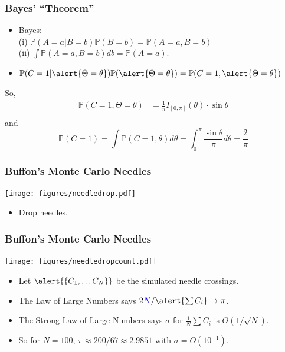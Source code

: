 \documentclass[]{beamer}
\newcommand{\PP}{\ensuremath{\mathbb P}}
\newcommand{\ds}{\displaystyle}
\begin{document}
\begin{frame}[t]
  \frametitle{Bayes' ``Theorem''}
    \begin{itemize}
    \itemsep 1.2em
      \item Bayes:\\ (i) $\ds{\PP(A = a| B = b)\PP(B = b) = \PP(A = a, B = b)}$ \\ (ii) $\int \PP(A = a, B = b)db = \PP(A = a)$.
      \item $\ds{\PP(C =1| \alert{\Theta = \theta} ) \PP(\alert{\Theta = \theta }) } = \PP(C =1, \alert{\Theta = \theta} )$ 
    \end{itemize}
    So,
    \begin{align*}
      \PP( C =1, \Theta = \theta ) 
        &= \frac1\pi I_{[0,\pi]}(\theta) \cdot \sin\theta \\
    \end{align*}
    and
        $$\PP(C =1) = \int \PP(C=1,\theta) d\theta = \int_0^\pi\frac{\sin \theta}\pi d\theta = \frac 2\pi$$
\end{frame}
\begin{frame}
  \frametitle{Buffon's Monte Carlo Needles}
  \texttt{[image: figures/needledrop.pdf]}

  \begin{itemize}
  \item<only@1>{Drop \color{blue}{$N$} needles.}
  \end{itemize}
\end{frame}
\begin{frame}
  \frametitle{Buffon's Monte Carlo Needles}
  \texttt{[image: figures/needledropcount.pdf]}

  \begin{itemize}
  \item<only@1>{Let $\alert{\{C_1,\dots C_{N}\}}$ be the simulated needle crossings.}
  \item<only@2>{The Law of Large Numbers says $2 \textcolor{blue}{N} / \alert{\sum C_i} \to \pi$.}
  \item<only@3>{The Strong Law of Large Numbers says $\sigma$ for $\frac 1N \sum C_i$ is $O( 1/\sqrt{N} )$.}
  \item<only@4>{So for $N = 100$, $\pi \approx 200/67 \approx 2.9851$ with $\sigma = O(10^{-1})$.}
  \end{itemize}
\end{frame}
\end{document}
